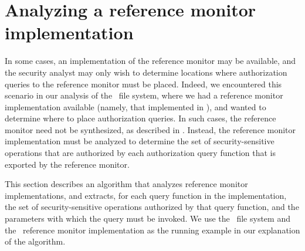 \section{Analyzing a reference monitor implementation}
\label{chapter:section:hookanal}

In some cases, an implementation of the reference monitor may be available, and
the security analyst may only wish to determine locations where authorization
queries to the reference monitor must be placed. Indeed, we encountered this
scenario in our analysis of the \ext\ file system, where we had a reference
monitor implementation available (namely, that implemented in \selinux), and
wanted to determine where to place authorization queries.  In such cases, the
reference monitor need not be synthesized, as described in
. Instead, the reference monitor
implementation must be analyzed to determine the set of security-sensitive
operations that are authorized by each authorization query function that is
exported by the reference monitor. 

This section describes an algorithm that analyzes reference monitor
implementations, and extracts, for each query function in the implementation,
the set of security-sensitive operations authorized by that query function, and
the parameters with which the query must be invoked. We use the \ext\ file
system and the \selinux\ reference monitor implementation as the running
example in our explanation of the algorithm.

